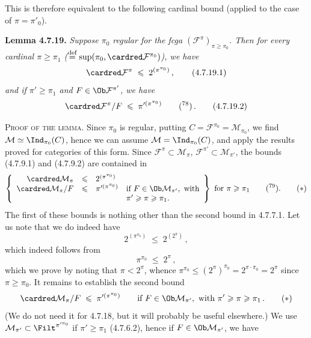 This is therefore equivalent to the following cardinal bound (applied to the case of $\pi=\pi'_0$).

\textbf{Lemma 4.7.19.} \textit{Suppose $\pi_0$ regular for the fcga $(\mathcal{F}^{\pi})_{\pi\geqslant\pi_0}$. Then for every cardinal $\pi\geqslant\pi_1$ ($\overset{\text{def}}{=}\sup(\pi_0,\cardred\mathcal{F}^{\pi_0})$), we have}
\[
\cardred\mathcal{F}^{\pi} \;\leqslant\; 2^{(\pi^{\pi_0})} \, , \tag*{(4.7.19.1)}
\]
\textit{and if $\pi'\geqslant\pi_1$ and $F\in\Ob\mathcal{F}^{\pi'}$, we have}
\[
\cardred\mathcal{F}^{\pi}/F \;\leqslant\; \pi'^{(\pi^{\pi_0})} \qquad \text{(\footnotemark[78])} \, . \tag*{(4.7.19.2)}
\]

\noindent{}\textsc{Proof of the lemma}. Since $\pi_0$ is regular, putting $C=\mathcal{F}^{\pi_0}=\mathcal{M}_{\pi_0}$, we find $\mathcal{M}\simeq\Ind_{\pi_0}(C)$, hence we can assume $\mathcal{M}=\Ind_{\pi_0}(C)$, and apply the results proved for categories of this form. Since $\mathcal{F}^{\pi}\subset\mathcal{M}_\pi$, $\mathcal{F}^{\pi'}\subset\mathcal{M}_{\pi'}$, the bounds (4.7.9.1) and (4.7.9.2) are contained in %
\[
\left\{
\begin{array}{rcll}
\cardred\mathcal{M}_\pi & \leqslant & 2^{(\pi^{\pi_0})} & \\
\cardred\mathcal{M}_\pi/F & \leqslant & \pi'^{(\pi^{\pi_0})} & \text{if } F\in\Ob\mathcal{M}_{\pi'},\ \text{with}\\
 & & & \pi'\geqslant\pi\geqslant\pi_1.
\end{array}
\right\}
\ \text{for } \pi\geqslant\pi_1 \qquad \text{(\footnotemark[79])}. \tag*{$(*)$}
\]
The first of these bounds is nothing other than the second bound in 4.7.7.1. Let us note that we do indeed have
\[
2^{(\pi^{\pi_0})} \;\leqslant\; 2^{(2^{\pi})} \, ,
\]
which indeed follows from
\[
\pi^{\pi_0} \;\leqslant\; 2^{\pi} \, ,
\]
which we prove by noting that $\pi<2^{\pi}$, whence $\pi^{\pi_0}\leqslant(2^{\pi})^{\pi_0}=2^{\pi\cdot\pi_0}=2^{\pi}$ since $\pi\geqslant\pi_0$. It remains to establish the second bound
\[
\cardred\mathcal{M}_\pi/F \;\leqslant\; \pi'^{(\pi^{\pi_0})} \qquad \text{if } F\in\Ob\mathcal{M}_{\pi'},\ \text{with } \pi'\geqslant\pi\geqslant\pi_1 \, . \tag*{$(*)$}
\]
(We do not need it for 4.7.18, but it will probably be useful elsewhere.) We use $\mathcal{M}_{\pi'}\subset\Filt^{\pi'^{\pi_0}}$ if $\pi'\geqslant\pi_1$ (4.7.6.2), hence if $F\in\Ob\mathcal{M}_{\pi'}$, we have